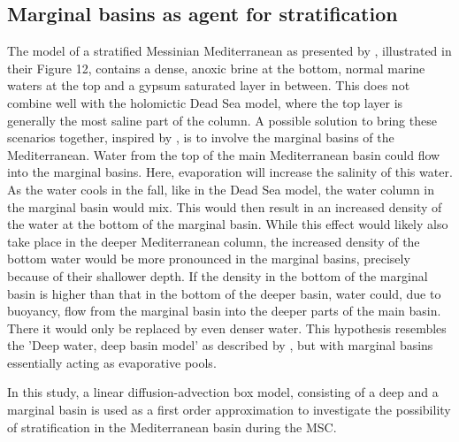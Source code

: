 \documentclass[twocolumn]{article}
\begin{document}
\subsection{Marginal basins as agent for stratification}
\label{uitleg_conceptuele_model}
The model of a stratified Messinian Mediterranean as presented by \cite{garcia2018geochemical}, illustrated in their Figure 12, contains a dense, anoxic brine at the bottom, normal marine waters at the top and a gypsum saturated layer in between. This does not combine well with the holomictic Dead Sea model, where the top layer is generally the most saline part of the column. A possible solution to bring these scenarios together, inspired by \cite{waahlin2006entraining}, is to involve the marginal basins of the Mediterranean. Water from the top of the main Mediterranean basin could flow into the marginal basins. Here, evaporation will increase the salinity of this water. As the water cools in the fall, like in the Dead Sea model, the water column in the marginal basin would mix. This would then result in an increased density of the water at the bottom of the marginal basin. While this effect would likely also take place in the deeper Mediterranean column, the increased density of the bottom water would be more pronounced in the marginal basins, precisely because of their shallower depth. If the density in the bottom of the marginal basin is higher than that in the bottom of the deeper basin, water could, due to buoyancy, flow from the marginal basin into the deeper parts of the main basin. There it would only be replaced by even denser water. This hypothesis resembles the 'Deep water, deep basin model' as described by \cite{schmalz1969deep}, but with marginal basins essentially acting as evaporative pools. 

In this study, a linear diffusion-advection box model, consisting of a deep and a marginal basin is used as a first order approximation to investigate the possibility of stratification in the Mediterranean basin during the MSC. 

\end{document}
